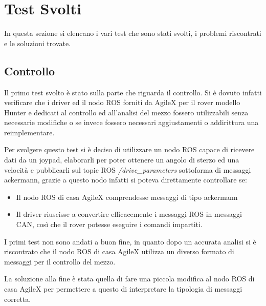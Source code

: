 \section{Test Svolti}
In questa sezione si elencano i vari test che sono stati svolti, i problemi riscontrati e le soluzioni trovate.

\subsection{Controllo}
Il primo test svolto è stato sulla parte che riguarda il controllo. Si è dovuto infatti verificare che i driver ed il nodo ROS forniti da AgileX per il rover modello Hunter e dedicati al controllo ed all'analisi del mezzo fossero utilizzabili senza necessarie modifiche o se invece fossero necessari aggiustamenti o addirittura una reimplementare.

\noindent Per svolgere questo test si è deciso di utilizzare un nodo ROS capace di ricevere dati da un joypad, elaborarli per poter ottenere un angolo di sterzo ed una velocità e pubblicarli sul topic ROS \textit{/drive\_parameters} sottoforma di messaggi ackermann, grazie a questo nodo infatti si poteva direttamente controllare se:

\begin{itemize}
  \item Il nodo ROS di casa AgileX comprendesse messaggi di tipo ackermann
  \item Il driver riuscisse a convertire efficacemente i messaggi ROS in messaggi CAN, così che il rover potesse eseguire i comandi impartiti.
\end{itemize}

\noindent I primi test non sono andati a buon fine, in quanto dopo un accurata analisi si è riscontrato che il nodo ROS di casa AgileX utilizza un diverso formato di messaggi per il controllo del mezzo.

\noindent La soluzione alla fine è stata quella di fare una piccola modifica al nodo ROS di casa AgileX per permettere a questo di interpretare la tipologia di messaggi corretta.
